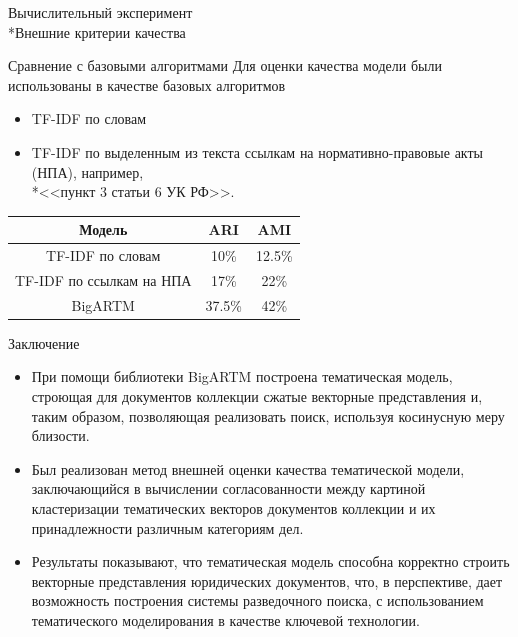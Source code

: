 \documentclass{beamer}
\begin{document}
\begin{frame}{Вычислительный эксперимент \\*Внешние критерии качества}
\begin{block}{Сравнение с базовыми алгоритмами}
	Для оценки качества модели были использованы в качестве базовых алгоритмов  
    \begin{itemize}
        \item TF-IDF по словам 
        \item TF-IDF по выделенным из текста ссылкам на нормативно-правовые акты (НПА), например, \\*<<пункт 3 статьи 6 УК РФ>>.
    \end{itemize} 
    \end{block}

\begin{table}[H]
\begin{center}
\begin{tabular}{|c|c|c|}
\hline
Модель & ARI & AMI\\
\hline
TF-IDF по словам & 10\% & 12.5\% \\
\hline
TF-IDF по ссылкам на НПА & 17\% & 22\% \\
\hline
BigARTM & 37.5\% & 42\% \\
\hline
\end{tabular}
\end{center}
\end{table}
\end{frame}
\begin{frame}{Заключение}
\begin{itemize}
\item При помощи библиотеки BigARTM построена тематическая модель, строющая для документов коллекции сжатые векторные представления и, таким образом, позволяющая реализовать поиск, используя косинусную меру близости.

\item Был реализован метод внешней оценки качества тематической модели, заключающийся в вычислении согласованности между картиной кластеризации тематических векторов документов коллекции и их принадлежности различным категориям дел.

\item Результаты показывают, что тематическая модель способна корректно строить векторные представления юридических документов, что, в перспективе, дает возможность построения системы разведочного поиска, с использованием тематического моделирования в качестве ключевой технологии.
    \end{itemize} 
\end{frame}
\end{document}
